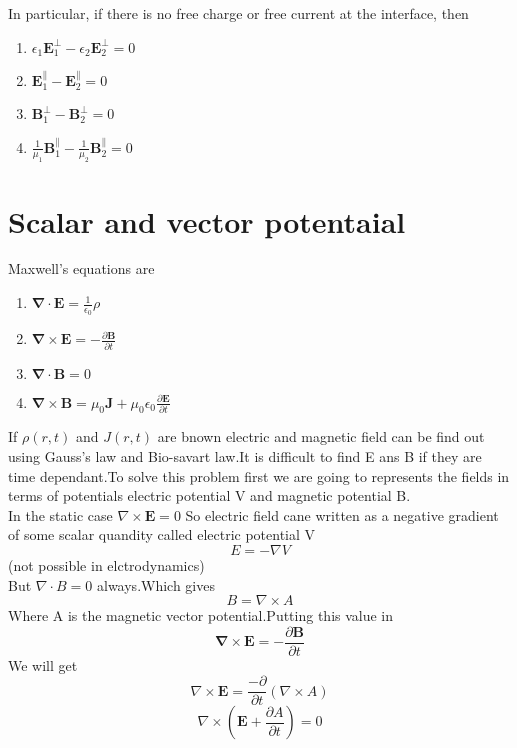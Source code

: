 In particular, if there is no free charge or free current at the interface, then 
\begin{enumerate}[label=(\roman*)]
	\item $\epsilon_{1} \mathbf{E}_{1}^{\perp}-\epsilon_{2} \mathbf{E}_{2}^{\perp}=0$
	\item $\mathbf{E}_{1}^{\|}-\mathbf{E}_{2}^{\|}=0$
	\item $\mathbf{B}_{1}^{\perp}-\mathbf{B}_{2}^{\perp}=0$
	\item $\frac{1}{\mu_{1}} \mathbf{B}_{1}^{\|}-\frac{1}{\mu_{2}} \mathbf{B}_{2}^{\|}=0$
\end{enumerate}

\section{Scalar and vector potentaial}
Maxwell's equations are
\begin{enumerate}[label=(\roman*)]
	\item $\boldsymbol{\nabla} \cdot \mathbf{E}=\frac{1}{\epsilon_{0}} \rho$
	\item $\boldsymbol{\nabla} \times \mathbf{E}=-\frac{\partial \mathbf{B}}{\partial t}$
	\item $\boldsymbol{\nabla} \cdot \mathbf{B}=0$
	\item $\boldsymbol{\nabla} \times \mathbf{B}=\mu_{0} \mathbf{J}+\mu_{0} \epsilon_{0} \frac{\partial \mathbf{E}}{\partial t}$
\end{enumerate}
If $\rho(r,t)$ and $J(r,t)$ are bnown electric and magnetic field can be find out using Gauss's law and Bio-savart law.It is difficult to find E ans B if they are time dependant.To solve this problem first we are going to represents the fields in terms of potentials electric potential V and magnetic potential B.\\
In the static case $\nabla \times \mathbf{E}=0$ So electric field cane written as a negative gradient of some scalar quandity called electric potential V\\
$$E=-\nabla V$$(not possible in elctrodynamics)\\
But $\nabla \cdot B=0$ always.Which gives \\
$$B=\nabla\times A$$
 Where A is the magnetic vector potential.Putting this value in 
$$\boldsymbol{\nabla} \times \mathbf{E}=-\frac{\partial \mathbf{B}}{\partial t}$$
We will get \\
$$\nabla \times \mathbf{E}=\frac{-\partial }{\partial t}(\nabla \times A)$$
$$\nabla \times \left( \mathbf{E}+\frac{\partial A}{\partial t}\right) =0$$
